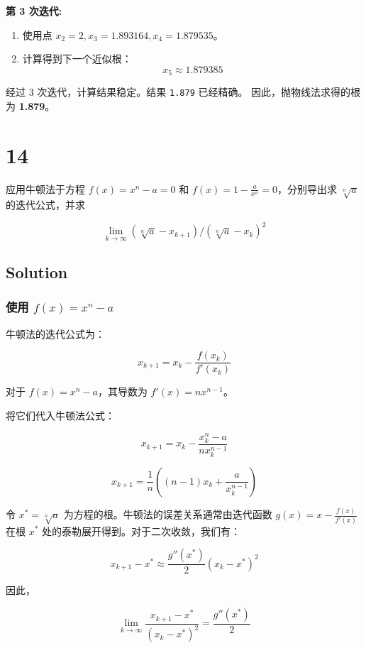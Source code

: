 \documentclass[11pt]{article}
\providecommand{\tightlist}{%
      \setlength{\itemsep}{0pt}\setlength{\parskip}{0pt}}
\begin{document}
\textbf{第 3 次迭代:}

\begin{enumerate}
\def\labelenumi{\arabic{enumi}.}
\tightlist
\item
  使用点 \(x_2=2, x_3=1.893164, x_4=1.879535\)。
\item
  计算得到下一个近似根： \[ x_5 \approx 1.879385 \]
\end{enumerate}

经过 3 次迭代，计算结果稳定。结果 \texttt{1.879} 已经精确。
因此，抛物线法求得的根为 \textbf{1.879}。

    \section{14}\label{section}

应用牛顿法于方程 \(f(x) = x^n - a = 0\) 和
\(f(x) = 1 - \frac{a}{x^n} = 0\)，分别导出求 \(\sqrt[n] a\)
的迭代公式，并求

\[
\lim_{k\to\infty} (\sqrt[n] a - x_{k + 1})/(\sqrt [n] a - x_k)^2
\]

\subsection{Solution}\label{solution}

\subsubsection{\texorpdfstring{使用
\(f(x) = x^n - a\)}{使用 f(x) = x\^{}n - a}}\label{ux4f7fux7528-fx-xn---a}

牛顿法的迭代公式为：

\[ x_{k+1} = x_k - \frac{f(x_k)}{f'(x_k)} \]

对于 \(f(x) = x^n - a\)，其导数为 \(f'(x) = nx^{n-1}\)。

将它们代入牛顿法公式：

\[ x_{k+1} = x_k - \frac{x_k^n - a}{nx_k^{n-1}} \]

\[ x_{k+1} = \frac{1}{n} \left( (n-1)x_k + \frac{a}{x_k^{n-1}} \right) \]

令 \(x^* = \sqrt[n]{a}\) 为方程的根。牛顿法的误差关系通常由迭代函数
\(g(x) = x - \frac{f(x)}{f'(x)}\) 在根 \(x^*\)
处的泰勒展开得到。对于二次收敛，我们有：

\[ x_{k+1} - x^* \approx \frac{g''(x^*)}{2}(x_k - x^*)^2 \]

因此，

\[ \lim_{k\to\infty} \frac{x_{k+1} - x^*}{(x_k - x^*)^2} = \frac{g''(x^*)}{2} \]
\end{document}
